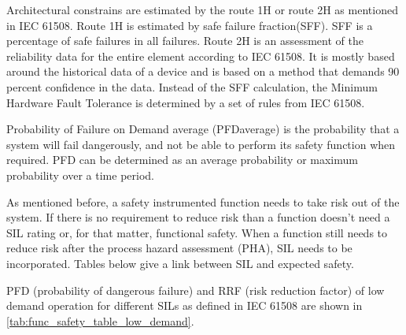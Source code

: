 Architectural constrains are estimated by the route 1H or route 2H as mentioned in IEC 61508. Route 1H is estimated by safe failure fraction(SFF). SFF is a percentage of safe failures in all failures. Route 2H is an assessment of the reliability data for the entire element according to IEC 61508. It is mostly based around the historical data of a device and is based on a method that demands 90 percent confidence in the data.  Instead of the SFF calculation, the Minimum Hardware Fault Tolerance is determined by a set of rules from IEC 61508.

Probability of Failure on Demand average (PFDaverage) is the probability that a system will fail dangerously, and not be able to perform its safety function when required. PFD can be determined as an average probability or maximum probability over a time period.

As mentioned before, a safety instrumented function needs to take risk out of the system. If there is no requirement to reduce risk than a function doesn't need a SIL rating or, for that matter, functional safety. When a function still needs to reduce risk after the process hazard assessment (PHA), SIL needs to be incorporated. Tables below give a link between SIL and expected safety.

PFD (probability of dangerous failure) and RRF (risk reduction factor) of low demand operation for different SILs as defined in IEC 61508 are shown in \autoref{tab:func_safety_table_low_demand}.

\begin{table}[H]
\centering
{}
\caption{Link between SIL, PFH and RRF for low demand operation}
\label{tab:func_safety_table_low_demand}
\end{table}

